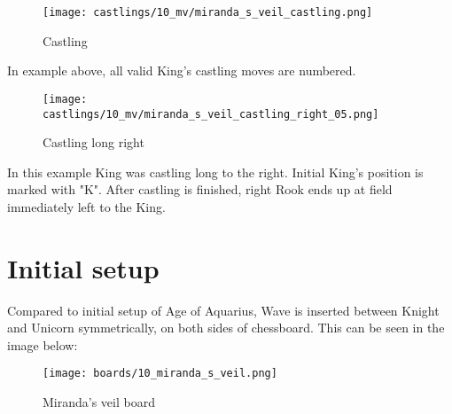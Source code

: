 \noindent
\begin{figure}[!h]
\texttt{[image: castlings/10\_mv/miranda\_s\_veil\_castling.png]}
\caption{Castling}
\label{fig:miranda_s_veil_castling}
\end{figure}

In example above, all valid King's castling moves are numbered.

\noindent
\begin{figure}[!h]
\texttt{[image: castlings/10\_mv/miranda\_s\_veil\_castling\_right\_05.png]}
\caption{Castling long right}
\label{fig:miranda_s_veil_castling_right_05}
\end{figure}

In this example King was castling long to the right. Initial King's position is marked with "K".
After castling is finished, right Rook ends up at field immediately left to the King.

\clearpage %

\section*{Initial setup}

Compared to initial setup of Age of Aquarius, Wave is inserted between Knight and Unicorn
symmetrically, on both sides of chessboard. This can be seen in the image below:

\noindent
\begin{figure}[h]
\texttt{[image: boards/10\_miranda\_s\_veil.png]}
\caption{Miranda's veil board}
\label{fig:10_miranda_s_veil}
\end{figure}

\clearpage %
